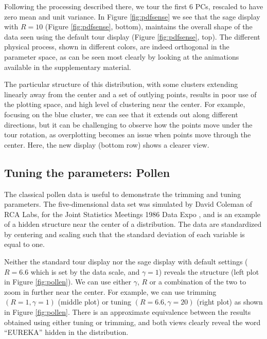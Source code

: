 \documentclass[]{interact}
\theoremstyle{plain}%
\theoremstyle{definition}
\theoremstyle{remark}
\begin{document}
Following the processing described there, we tour the first 6 PCs,
rescaled to have zero mean and unit variance. In Figure
\ref{fig:pdfsense} we see that the sage display with \(R = 10\) (Figure
\ref{fig:pdfsense}, bottom), maintains the overall shape of the data
seen using the default tour display (Figure \ref{fig:pdfsense}, top).
The different physical process, shown in different colors, are indeed
orthogonal in the parameter space, as can be seen most clearly by
looking at the animations available in the supplementary material.

The particular structure of this distribution, with some clusters
extending linearly away from the center and a set of outlying points,
results in poor use of the plotting space, and high level of clustering
near the center. For example, focusing on the blue cluster, we can see
that it extends out along different directions, but it can be
challenging to observe how the points move under the tour rotation, as
overplotting becomes an issue when points move through the center. Here,
the new display (bottom row) shows a clearer view.

\hypertarget{sec:appl4}{%
\subsection{Tuning the parameters: Pollen}\label{sec:appl4}}

The classical pollen data is useful to demonstrate the trimming and
tuning parameters. The five-dimensional data set was simulated by David
Coleman of RCA Labs, for the Joint Statistics Meetings 1986 Data Expo
\citep{pollen}, and is an example of a hidden structure near the center
of a distribution. The data are standardized by centering and scaling
such that the standard deviation of each variable is equal to one.

Neither the standard tour display nor the sage display with default
settings (\(R=6.6\) which is set by the data scale, and \(\gamma=1\))
reveals the structure (left plot in Figure \ref{fig:pollen}). We can use
either \(\gamma\), \(R\) or a combination of the two to zoom in further
near the center. For example, we can use trimming \((R=1, \gamma=1)\)
(middle plot) or tuning \((R=6.6,\gamma=20)\) (right plot) as shown in
Figure \ref{fig:pollen}. There is an approximate equivalence between the
results obtained using either tuning or trimming, and both views clearly
reveal the word ``EUREKA'' hidden in the distribution.
\end{document}
